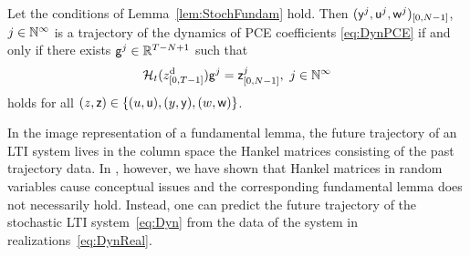 \begin{cor}\label{coro:StochFundamPCE}
	Let the conditions of Lemma~\ref{lem:StochFundam} hold. Then $ (\mathsf{y}^j, \mathsf{u}^j, \mathsf{w}^j)_{[0,N-1]}$, $j \in \mathbb{N}^\infty$ is a trajectory of the dynamics of PCE coefficients \eqref{eq:DynPCE} if and only if there exists $\mathsf{g}^j \in \mathbb{R}^{T-N+1}$ such that 
	\begin{equation*}
		\mathcal{H}_t(z_{[0,T-1]}^{\mathrm{d}}) \mathsf{g}^j =\mathsf{z}^j_{[0,N-1]},~j\in \mathbb{N}^\infty
	\end{equation*} 
	holds for all $(z, \mathsf{z})\in \{(u,\mathsf{u}), (y,\mathsf{y}), (w, \mathsf{w})\}$.
\end{cor}
In the image representation of a fundamental lemma, the future trajectory of an LTI system lives in the column space the Hankel matrices consisting of the past trajectory data. In \citet{pan23stochastic}, however, we have shown that Hankel matrices in random variables cause conceptual issues and the corresponding fundamental lemma does not necessarily hold. Instead, one can predict the future trajectory of the stochastic LTI system~\eqref{eq:Dyn} from the data of the system in realizations~\eqref{eq:DynReal}.